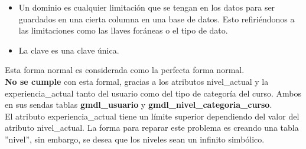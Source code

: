     \begin{itemize}
        \item Un dominio es cualquier limitación que se tengan en los datos para ser guardados en una cierta columna en una base de datos. Esto refiriéndonos a las limitaciones como las llaves foráneas o el tipo de dato.
        \item La clave es una clave única.
    \end{itemize}
    
    \noindent Esta forma normal es considerada como la perfecta forma normal.\\
    
    \noindent \textbf{No se cumple} con esta formal, gracias a los atributos nivel\_actual y la experiencia\_actual tanto del usuario como del tipo de categoría del curso. Ambos en sus sendas tablas \textbf{gmdl\_usuario} y \textbf{gmdl\_nivel\_categoria\_curso}.\\ 
    
    \noindent El atributo experiencia\_actual tiene un límite superior dependiendo del valor del atributo nivel\_actual. La forma para reparar este problema es creando una tabla ''nivel'', sin embargo, se desea que los niveles sean un infinito simbólico.
    
    
    
    
    
\begin{comment}
    
    \noindent \textbf{No se cumple} con esta forma normal en la tabla \textbf{gmdl\_condicion} debido a que  los valores del atributo ''atributo'' dependen del valor del atributo ''tabla''.
    
    \noindent Se considera que el incumplimiento anterior no será atendido, esto por que para resolverlo se necesitaría crear 2 tablas extras que contengan todas las tablas relacionadas con Moodle y todos los atributos asociados con esas tablas. Estas tablas actuarían como un catálogo para la tabla \textbf{gmdl\_condicion} y se tendrían que estar actualizando si se quiere que los plugins a desarrollar tengan compatibilidad con versiones posteriores de Moodle.
    
    \noindent Otro motivo por el cual no se atiende es que los datos de la tabla \textbf{gmdl\_condicion} nunca cambiarán una vez que se haya creado la base de datos y llenado los valores por defecto.
\end{comment}    

